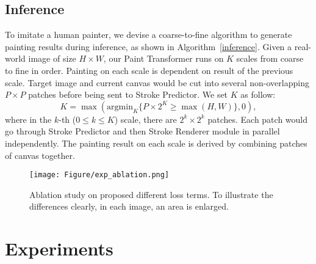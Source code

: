 \documentclass[10pt,twocolumn,letterpaper]{article}
\begin{document}
\subsection{Inference}
To imitate a human painter, we devise a coarse-to-fine algorithm to generate painting results during inference, as shown in Algorithm~\ref{inference}. 
Given a real-world image of size $H\times W$, our Paint Transformer runs on $K$ scales from coarse to fine in order.
Painting on each scale is dependent on result of the previous scale. 
Target image and current canvas would be cut into several non-overlapping $P\times P$ patches before being sent to Stroke Predictor.
We set $K$ as follow:
\begin{equation}
    K=\max(\mathrm{argmin}_K\{P\times 2^K\geq\max(H,W)\},0),
\end{equation}
where in the $k$-th ($0\leq k \leq K$) scale, there are $2^k\times 2^k$ patches. 
Each patch would go through Stroke Predictor and then Stroke Renderer module in parallel independently. 
The painting result on each scale is derived by combining patches of canvas together. 

\begin{figure*}[t]
\begin{center}
\texttt{[image: Figure/exp\_ablation.png]}
\end{center}
\vspace{-0.5cm}
   \caption{Ablation study on proposed different loss terms. To illustrate the differences clearly, in each image, an area is enlarged.}
   \vspace{-0.2cm}
\label{fig:exp_ablation}
\end{figure*}

\section{Experiments}
\end{document}
